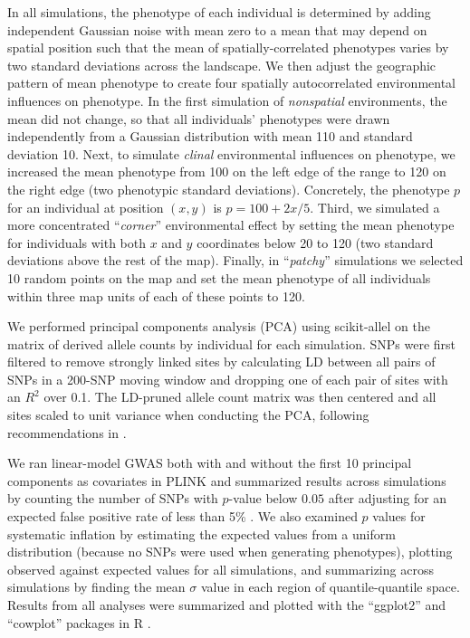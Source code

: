 \documentclass[10pt,twoside,lineno,hidelinks]{preprint}
\begin{document}
In all simulations, the phenotype of each individual
is determined by adding independent Gaussian noise with mean zero 
to a mean that may depend on spatial position such that the mean of spatially-correlated phenotypes varies by two standard deviations across the landscape.
We then adjust the geographic pattern of mean phenotype to create four spatially autocorrelated environmental influences on phenotype.
In the first simulation of \emph{nonspatial} environments, the mean did not change,
so that all individuals' phenotypes were drawn independently from a Gaussian distribution with mean 110 and standard deviation 10.
Next, to simulate \emph{clinal} environmental influences on phenotype, 
we increased the mean phenotype from 100 on the left edge of the range to 120 on the right edge (two phenotypic standard deviations).
Concretely, the phenotype $p$ for an individual at position $(x,y)$ is $p=100 + 2x / 5$.
Third, we simulated a more concentrated ``\emph{corner}'' environmental effect by setting the mean phenotype 
for individuals with both $x$ and $y$ coordinates below 20 to 120 (two standard deviations above the rest of the map). 
Finally, in ``\emph{patchy}'' simulations we selected 10 random points on the map
and set the mean phenotype of all individuals within three map units of each of these points
to 120.

We performed principal components analysis (PCA) using scikit-allel \citep{Miles2017} on the matrix of derived allele counts by individual for each simulation. 
SNPs were first filtered to remove strongly linked sites by calculating LD between all pairs of SNPs in a 200-SNP moving window and dropping one of each pair of sites with an $R^2$ over 0.1. The LD-pruned allele count matrix was then centered and all sites scaled to unit variance when conducting the PCA, following recommendations in \citet{Patterson2006}.   

We ran linear-model GWAS both with and without the first 10 principal components as covariates in PLINK and summarized results across simulations by counting the number of SNPs 
with $p$-value below $0.05$ after adjusting for an expected false positive rate of less than 5\% \citep{benjamini2001control}. 
We also examined $p$ values for systematic inflation 
by estimating the expected values from a uniform distribution (because no SNPs were used when generating phenotypes), plotting observed against expected values for all simulations, and summarizing across simulations by finding the mean $\sigma$ value in each region of quantile-quantile space. 
Results from all analyses were summarized and plotted with the ``ggplot2'' \citep{Wickham2016} and ``cowplot'' \citep{Wilke2019} packages in R \citep{Rcore2018}. 
\end{document}
